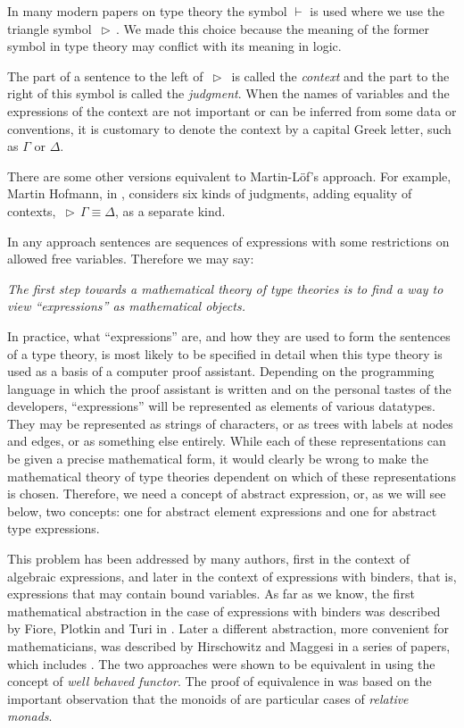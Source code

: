 \documentclass[12pt]{amsart}
\numberwithin{proposition}{subsection}
\DeclareMathOperator{\rh}{\,\rhd\,}
\begin{document}
In many modern papers on type theory the symbol $\vdash$ is used where we use
the triangle symbol $\rh$. We made this choice because the meaning of the
former symbol in type theory may conflict with its meaning in logic.

The part of a sentence to the left of $\rh$ is called the {\em context} and the part
to the right of this symbol is called the {\em judgment}. When the names of
variables and the expressions of the context are not important or can be
inferred from some data or conventions, it is customary to denote the context
by a capital Greek letter, such as $\Gamma$ or $\Delta$.

There are some other versions equivalent to Martin-L\"{o}f's approach. For
example, Martin Hofmann, in \cite{Hofmann}, considers six kinds of judgments,
adding equality of contexts, $\rh \Gamma\equiv\Delta$, as a separate kind.

In any approach sentences are sequences of expressions with some restrictions
on allowed free variables. Therefore we may say:

{\em The first step towards a mathematical theory of type theories is to find a
  way to view ``expressions'' as mathematical objects.}

In practice, what ``expressions'' are, and how they are used to form the sentences of a type theory,
is most likely to be specified in detail when this type theory is
used as a basis of a computer proof assistant. Depending on the programming
language in which the proof assistant is written and on the personal tastes of
the developers, ``expressions'' will be represented as elements of various
datatypes. They may be represented as strings of characters, or as trees
with labels at nodes and edges, or as something else entirely.  While
each of these representations can be given a precise mathematical form, it would
clearly be wrong to make the mathematical theory of type theories dependent on
which of these representations is chosen.  Therefore, we need a concept of
abstract expression, or, as we will see below, two concepts: one for abstract
element expressions and one for abstract type expressions.

This problem has been addressed by many authors, first in the context of
algebraic expressions, and later in the context of expressions with binders,
that is, expressions that may contain bound variables. As far as we know, the
first mathematical abstraction in the case of expressions with binders was
described by Fiore, Plotkin and Turi in \cite{FPT}. Later a different abstraction,
more convenient for mathematicians, was described by Hirschowitz and
Maggesi in a series of papers, which includes \cite{HM2010}.  The two approaches were
shown to be equivalent in \cite{ACU,ACU2} using the concept of {\em well
behaved functor}.
The proof of equivalence in \cite{ACU,ACU2} was based on the important
observation that the monoids of \cite{FPT} are particular cases of {\em
  relative monads}.
\end{document}
